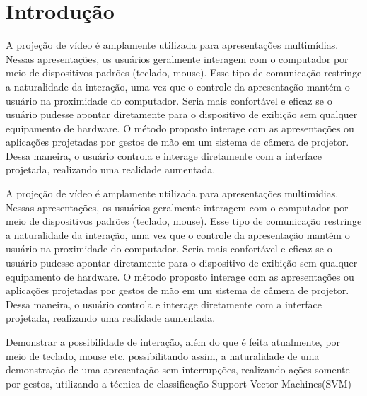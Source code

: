 \documentclass[12pt,oneside,a4paper,chapter=TITLE,section=TITLE,sumario=tradicional]{abntex2}
\begin{document}
\chapter{Introdução}
\label{cap:introducao}


A projeção de vídeo é amplamente utilizada para apresentações multimídias. Nessas apresentações, os usuários geralmente interagem com o computador por meio de dispositivos padrões (teclado, mouse). Esse tipo de comunicação restringe a naturalidade da interação, uma vez que o controle da apresentação mantém o usuário na proximidade do computador. Seria mais confortável e eficaz se o usuário pudesse apontar diretamente para o dispositivo de exibição sem qualquer equipamento de hardware. 
O método proposto interage com as apresentações ou aplicações projetadas por gestos de mão em um sistema de câmera de projetor. Dessa maneira, o usuário controla e interage diretamente com a interface projetada, realizando uma realidade aumentada. 


\begin{lista}
    \item A projeção de vídeo é amplamente utilizada para apresentações multimídias. Nessas apresentações, os usuários geralmente interagem com o computador por meio de dispositivos padrões (teclado, mouse). Esse tipo de comunicação restringe a naturalidade da interação, uma vez que o controle da apresentação mantém o usuário na proximidade do computador. Seria mais confortável e eficaz se o usuário pudesse apontar diretamente para o dispositivo de exibição sem qualquer equipamento de hardware. 
O método proposto interage com as apresentações ou aplicações projetadas por gestos de mão em um sistema de câmera de projetor. Dessa maneira, o usuário controla e interage diretamente com a interface projetada, realizando uma realidade aumentada.
    \item Demonstrar a possibilidade de interação, além do que é feita atualmente, por meio de teclado, mouse etc.  possibilitando assim, a naturalidade de uma demonstração de uma apresentação sem interrupções, realizando ações somente por gestos, utilizando a técnica  de classificação Support Vector Machines(SVM) 
\end{lista}

\end{document}

